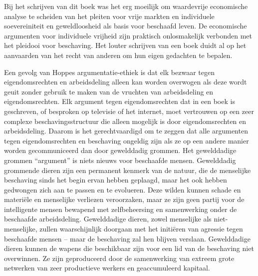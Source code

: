 Bij het schrijven van dit boek was het erg moeilijk om waardevrije economische analyse te scheiden van het pleiten voor vrije markten en individuele soevereiniteit en geweldloosheid als basis voor beschaafd leven. De economische argumenten voor individuele vrijheid zijn praktisch onlosmakelijk verbonden met het pleidooi voor beschaving. Het louter schrijven van een boek duidt al op het aanvaarden van het recht van anderen om hun eigen gedachten te bepalen.

Een gevolg van Hoppe\textquotesingle s argumentatie-ethiek is dat elk bezwaar tegen eigendomsrechten en arbeidsdeling alleen kan worden overwogen als deze wordt geuit zonder gebruik te maken van de vruchten van arbeidsdeling en eigendomsrechten. Elk argument tegen eigendomsrechten dat in een boek is geschreven, of besproken op televisie of het internet, moet vertrouwen op een zeer complexe beschavingsstructuur die alleen mogelijk is door eigendomsrechten en arbeidsdeling. Daarom is het gerechtvaardigd om te zeggen dat alle argumenten tegen eigendomsrechten en beschaving ongeldig zijn als ze op een andere manier worden gecommuniceerd dan door gewelddadig grommen. Het gewelddadige grommen ``argument'' is niets nieuws voor beschaafde mensen. Gewelddadig grommende dieren zijn een permanent kenmerk van de natuur, die de menselijke beschaving sinds het begin ervan hebben geplaagd, maar het ook hebben gedwongen zich aan te passen en te evolueren. Deze wilden kunnen schade en materiële en menselijke verliezen veroorzaken, maar ze zijn geen partij voor de intelligente mensen bewapend met zelfbeheersing en samenwerking onder de beschaafde arbeidsdeling. Gewelddadige dieren, zowel menselijke als niet-menselijke, zullen waarschijnlijk doorgaan met het initiëren van agressie tegen beschaafde mensen -- maar de beschaving zal hen blijven verslaan. Gewelddadige dieren kunnen de wapens die beschikbaar zijn voor een lid van de beschaving niet overwinnen. Ze zijn geproduceerd door de samenwerking van extreem grote netwerken van zeer productieve werkers en geaccumuleerd kapitaal.

